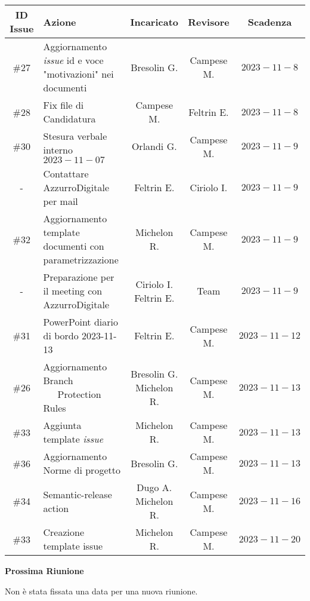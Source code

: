\documentclass[10pt, a4paper]{article}
\begin{document}
{\renewcommand{\arraystretch}{1.5}
\begin{tabularx}{\textwidth}{c|X|c|c|c}
\textbf{ID Issue} & \textbf{Azione} & \textbf{Incaricato} & \textbf{Revisore} & \textbf{Scadenza} \\
\hline 
\#27 & Aggiornamento \textit{issue} id e voce "motivazioni" nei documenti  & Bresolin G. & Campese M. & $2023-11-8$ \\
\hline
\#28 & Fix file di Candidatura & Campese M. & Feltrin E. & $2023-11-8$ \\
\hline
\#30 & Stesura verbale interno $2023-11-07$ & Orlandi G. & Campese M. & $2023-11-9$ \\
\hline 
- & Contattare AzzurroDigitale per mail & Feltrin E. & Ciriolo I. & $2023-11-9$ \\
\hline
\#32 & Aggiornamento template documenti con parametrizzazione  &  Michelon R. & Campese M. & $2023-11-9$ \\
\hline
- & Preparazione per il meeting con AzzurroDigitale  & \quantities{Ciriolo I.\\Feltrin E.} & Team & $2023-11-9$ \\
\hline
\#31 & PowerPoint diario di bordo 2023-11-13 & Feltrin E. & Campese M. & $2023-11-12$ \\
\hline
\#26 & Aggiornamento Branch \ \ \  Protection Rules & \quantities{Bresolin G. \\Michelon R.} & Campese M. & $2023-11-13$ \\
\hline
\#33 & Aggiunta template \textit{issue} & Michelon R. & Campese M. & $2023-11-13$ \\
\hline
\#36 & Aggiornamento Norme di progetto & Bresolin G. & Campese M. & $2023-11-13$ \\
\hline
\#34 & Semantic-release action & \quantities{Dugo A. \\ Michelon R.} & Campese M. & $2023-11-16$ \\
\hline
\#33 & Creazione template issue & Michelon R. & Campese M. & $2023-11-20$\\
\end{tabularx}}



\vspace{3em}


\textbf{Prossima Riunione}

Non è stata fissata una data per una nuova riunione.
\end{document}
